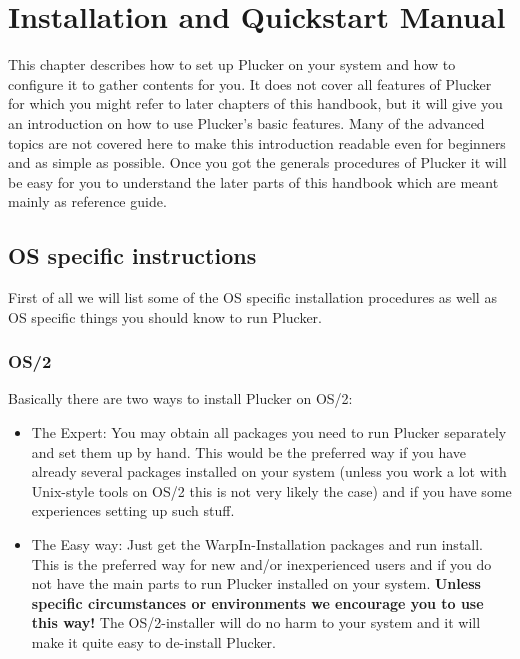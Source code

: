 %
%
\chapter{Installation and Quickstart Manual}

This chapter describes how to set up Plucker on your system and how to
configure it to gather contents for you. It does not cover all
features of Plucker for which you might refer to later chapters of
this handbook, but it will give you an introduction on how to use
Plucker's basic features. Many of the advanced topics are not covered
here to make this introduction readable even for beginners and as
simple as possible. Once you got the generals procedures of Plucker it
will be easy for you to understand the later parts of this handbook
which are meant mainly as reference guide.

\section{OS specific instructions}

First of all we will list some of the OS specific installation
procedures as well as OS specific things you should know to run
Plucker.

\subsection{OS/2}

Basically there are two ways to install Plucker on OS/2:

\begin{itemize}
  \item The Expert: You may obtain all packages you need to run
  Plucker separately and set them up by hand. This would be the
  preferred way if you have already several packages installed on your
  system (unless you work a lot with Unix-style tools on OS/2 this is
  not very likely the case) and if you have some experiences setting
  up such stuff.

  \item The Easy way: Just get the WarpIn-Installation packages and
  run install. This is the preferred way for new and/or inexperienced
  users and if you do not have the main parts to run Plucker installed
  on your system. \textbf{Unless specific circumstances or
  environments we encourage you to use this way!} The OS/2-installer
  will do no harm to your system and it will make it quite easy to
  de-install Plucker.
\end{itemize}

